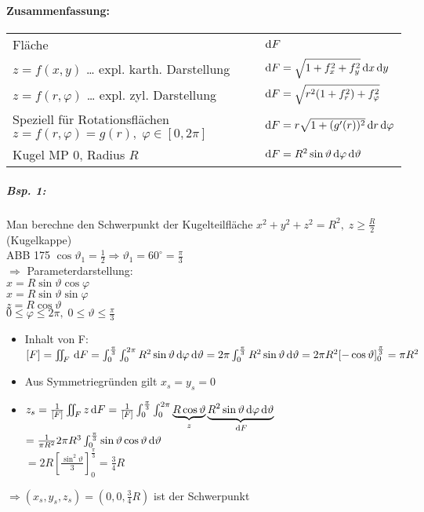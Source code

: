 \paragraph{Zusammenfassung:}\parskp
\begin{tabular}{L{0.5} | L{0.4}}
Fläche & $\mathrm{d}F$\\
$z=f(x,y)$ … expl. karth. Darstellung & $\mathrm{d}F=\sqrt{1+f_x^2+f_y^2}\,\mathrm{d}x\,\mathrm{d}y$\\
$z=f(r,\varphi)$ … expl. zyl. Darstellung & $\mathrm{d}F=\sqrt{r^2(1+f_r^2)+f_\varphi^2}$\\
Speziell für Rotationsflächen $z=f(r,\varphi)=g(r), \; \varphi \in [0,2\pi]$ & $\mathrm{d}F=r\sqrt{1+(g'(r))^2}\,\mathrm{d}r\,\mathrm{d}\varphi$\\
Kugel MP $0$, Radius $R$ & $\mathrm{d}F=R^2\sin \vartheta \,\mathrm{d}\varphi\,\mathrm{d}\vartheta$
\end{tabular}
\subparagraph{Bsp. 1:} Man berechne den Schwerpunkt der Kugelteilfläche $x^2+y^2+z^2=R^2, \; z\geq \frac{R}{2}$ (Kugelkappe)\\
ABB 175
$\cos \vartheta_1=\frac{1}{2}\Rightarrow \vartheta_1=60^\circ = \frac{\pi}{3}$
\\
$\Rightarrow $ Parameterdarstellung:\\
$x=R \sin\vartheta \cos \varphi$\\
$x=R \sin\vartheta \sin \varphi$\\
$z=R\cos \vartheta$\\
$0\leq \varphi \leq 2\pi,\; 0 \leq \vartheta \leq \frac{\pi}{3}$
\begin{itemize}
\item Inhalt von F: $[F]=\iint_F \,\mathrm{d}F=\int_0^{\frac{\pi}{3}}\int_0^{2\pi}R^2\sin\vartheta\,\mathrm{d}\varphi\,\mathrm{d}\vartheta\\
=2\pi\int_0^{\frac{\pi}{3}}R^2\sin\vartheta \,\mathrm{d}\vartheta=2\pi R^2[-\cos\vartheta]_0^{\frac{\pi}{3}}=\pi R^2$
\item Aus Symmetriegründen gilt $x_s=y_s=0$
\item $z_s=\frac{1}{[F]}\iint_F z \,\mathrm{d}F=\frac{1}{[F]}\int_0^{\frac{\pi}{3}}\int_0^{2\pi}\underbrace{R \cos \vartheta}_{z} \underbrace{R^2 \sin \vartheta \,\mathrm{d}\varphi\,\mathrm{d}\vartheta}_{\,\mathrm{d}F}$\\
$=\frac{1}{\pi R^2}2\pi R^3\int_0^{\frac{\pi}{3}}\sin\vartheta \cos \vartheta\,\mathrm{d}\vartheta$\\
$=2R\left[\frac{\sin^2\vartheta}{3}\right]_0^{\frac{\pi}{3}}=\frac{3}{4}R$
\end{itemize}
$\Rightarrow (x_s,y_s,z_s)=\left(0,0,\frac{3}{4}R\right)$ ist der Schwerpunkt







